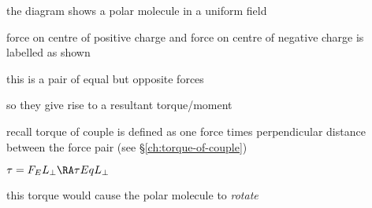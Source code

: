 the diagram shows a polar molecule in a uniform field

force on centre of positive charge and force on centre of negative charge is labelled as shown

this is a pair of equal but opposite forces

so they give rise to a resultant torque/moment

recall torque of couple is defined as one force times perpendicular distance between the force pair (see \S\ref{ch:torque-of-couple})

{
	\centering
	
	$\tau = F_E L_\perp \RA \tau Eq L_\perp$
	
}

this torque would cause the polar molecule to \emph{rotate}

